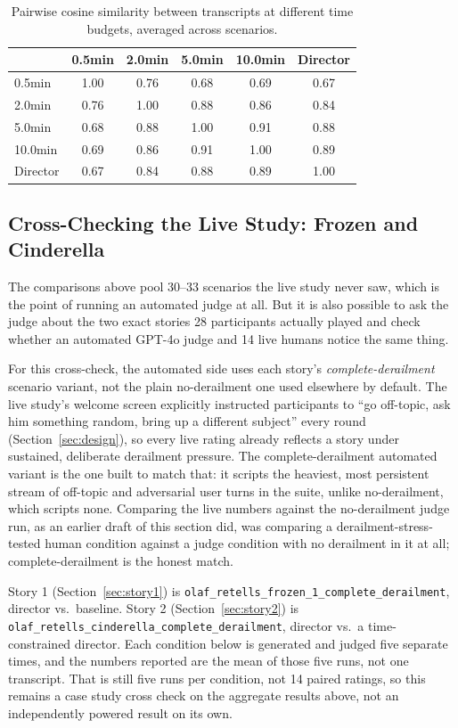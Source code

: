 \documentclass[10pt]{article}
\begin{document}
\begin{table}[htbp]
\centering
\caption{Pairwise cosine similarity between transcripts at different time budgets, averaged across scenarios.}
\label{tab:llm-time-sim}
\begin{tabular}{lccccc}
\toprule
 & 0.5min & 2.0min & 5.0min & 10.0min & Director \\
\midrule
0.5min    & 1.00 & 0.76 & 0.68 & 0.69 & 0.67 \\
2.0min    & 0.76 & 1.00 & 0.88 & 0.86 & 0.84 \\
5.0min    & 0.68 & 0.88 & 1.00 & 0.91 & 0.88 \\
10.0min   & 0.69 & 0.86 & 0.91 & 1.00 & 0.89 \\
Director  & 0.67 & 0.84 & 0.88 & 0.89 & 1.00 \\
\bottomrule
\end{tabular}
\end{table}

\subsection{Cross-Checking the Live Study: Frozen and Cinderella}
\label{sec:llm-vs-study}

The comparisons above pool 30--33 scenarios the live study never saw, which is the point of running an automated judge at all. But it is also possible to ask the judge about the two exact stories 28 participants actually played and check whether an automated GPT-4o judge and 14 live humans notice the same thing.

For this cross-check, the automated side uses each story's \emph{complete-derailment} scenario variant, not the plain no-derailment one used elsewhere by default. The live study's welcome screen explicitly instructed participants to ``go off-topic, ask him something random, bring up a different subject'' every round (Section~\ref{sec:design}), so every live rating already reflects a story under sustained, deliberate derailment pressure. The complete-derailment automated variant is the one built to match that: it scripts the heaviest, most persistent stream of off-topic and adversarial user turns in the suite, unlike no-derailment, which scripts none. Comparing the live numbers against the no-derailment judge run, as an earlier draft of this section did, was comparing a derailment-stress-tested human condition against a judge condition with no derailment in it at all; complete-derailment is the honest match.

Story 1 (Section~\ref{sec:story1}) is \texttt{olaf\_retells\_frozen\_1\_complete\_derailment}, director vs.\ baseline. Story 2 (Section~\ref{sec:story2}) is \texttt{olaf\_retells\_cinderella\_complete\_derailment}, director vs.\ a time-constrained director. Each condition below is generated and judged five separate times, and the numbers reported are the mean of those five runs, not one transcript. That is still five runs per condition, not 14 paired ratings, so this remains a case study cross check on the aggregate results above, not an independently powered result on its own.
\end{document}
